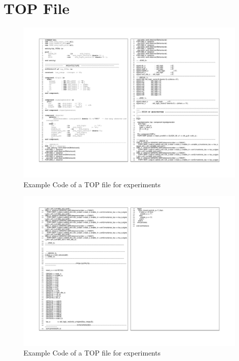 \clearpage

\section{TOP File}
\label{appendix:1:section:2}



\begin{figure}[]
\centering
\includegraphics[scale=0.80,angle=90]{Appendix1/pdf/TOP_10OBS_1.pdf}
\caption[TOP File Example-p1]{Example Code of a TOP file for experiments}
\label{appendix:source:3}
\end{figure}


\begin{figure}[]
\centering
\includegraphics[scale=0.80,angle=90]{Appendix1/pdf/TOP_10OBS_2.pdf}
\caption[TOP File Example-p1]{Example Code of a TOP file for experiments}
\label{appendix:source:4}
\end{figure}












